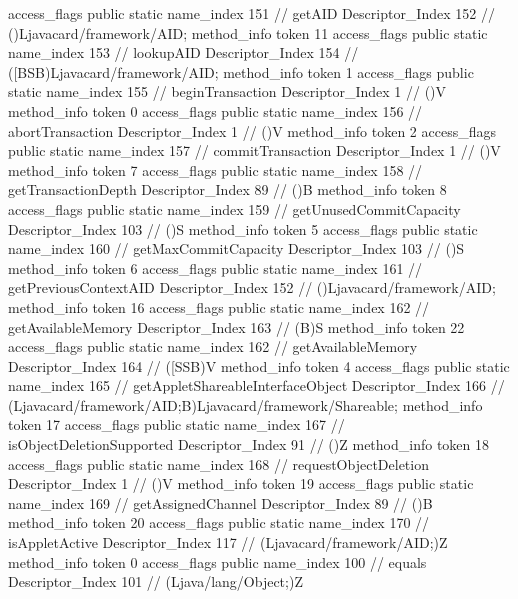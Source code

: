 {{{{{					access_flags	public static
					name_index	151		// getAID
					Descriptor_Index	152		// ()Ljavacard/framework/AID;
				}
				method_info {
					token	11
					access_flags	public static
					name_index	153		// lookupAID
					Descriptor_Index	154		// ([BSB)Ljavacard/framework/AID;
				}
				method_info {
					token	1
					access_flags	public static
					name_index	155		// beginTransaction
					Descriptor_Index	1		// ()V
				}
				method_info {
					token	0
					access_flags	public static
					name_index	156		// abortTransaction
					Descriptor_Index	1		// ()V
				}
				method_info {
					token	2
					access_flags	public static
					name_index	157		// commitTransaction
					Descriptor_Index	1		// ()V
				}
				method_info {
					token	7
					access_flags	public static
					name_index	158		// getTransactionDepth
					Descriptor_Index	89		// ()B
				}
				method_info {
					token	8
					access_flags	public static
					name_index	159		// getUnusedCommitCapacity
					Descriptor_Index	103		// ()S
				}
				method_info {
					token	5
					access_flags	public static
					name_index	160		// getMaxCommitCapacity
					Descriptor_Index	103		// ()S
				}
				method_info {
					token	6
					access_flags	public static
					name_index	161		// getPreviousContextAID
					Descriptor_Index	152		// ()Ljavacard/framework/AID;
				}
				method_info {
					token	16
					access_flags	public static
					name_index	162		// getAvailableMemory
					Descriptor_Index	163		// (B)S
				}
				method_info {
					token	22
					access_flags	public static
					name_index	162		// getAvailableMemory
					Descriptor_Index	164		// ([SSB)V
				}
				method_info {
					token	4
					access_flags	public static
					name_index	165		// getAppletShareableInterfaceObject
					Descriptor_Index	166		// (Ljavacard/framework/AID;B)Ljavacard/framework/Shareable;
				}
				method_info {
					token	17
					access_flags	public static
					name_index	167		// isObjectDeletionSupported
					Descriptor_Index	91		// ()Z
				}
				method_info {
					token	18
					access_flags	public static
					name_index	168		// requestObjectDeletion
					Descriptor_Index	1		// ()V
				}
				method_info {
					token	19
					access_flags	public static
					name_index	169		// getAssignedChannel
					Descriptor_Index	89		// ()B
				}
				method_info {
					token	20
					access_flags	public static
					name_index	170		// isAppletActive
					Descriptor_Index	117		// (Ljavacard/framework/AID;)Z
				}
				method_info {
					token	0
					access_flags	public
					name_index	100		// equals
					Descriptor_Index	101		// (Ljava/lang/Object;)Z
}}}}}
